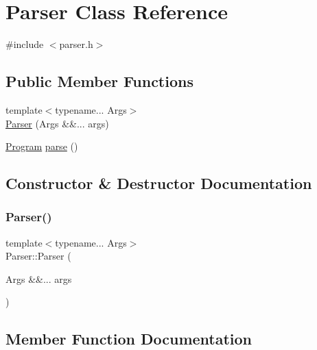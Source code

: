 \hypertarget{class_parser}{}\section{Parser Class Reference}
\label{class_parser}


{\ttfamily \#include $<$parser.\+h$>$}

\subsection*{Public Member Functions}
\begin{DoxyCompactItemize}
\item 
{\footnotesize template$<$typename... Args$>$ }\\\hyperlink{class_parser_aefb50af00ae004bfb809380c45a5ad7d}{Parser} (Args \&\&... args)
\item 
\hyperlink{struct_program}{Program} \hyperlink{class_parser_a20466f8f29d69499dfa12092cd737211}{parse} ()
\end{DoxyCompactItemize}


\subsection{Constructor \& Destructor Documentation}
\mbox{\label{class_parser_aefb50af00ae004bfb809380c45a5ad7d}} 
\subsubsection{\texorpdfstring{Parser()}{Parser()}}
{\footnotesize\ttfamily template$<$typename... Args$>$ \\
Parser\+::\+Parser (\begin{DoxyParamCaption}\item[{Args \&\&...}]{args }\end{DoxyParamCaption})\hspace{0.3cm}{\ttfamily [inline]}}



\subsection{Member Function Documentation}
\mbox{\label{class_parser_a20466f8f29d69499dfa12092cd737211}} 
